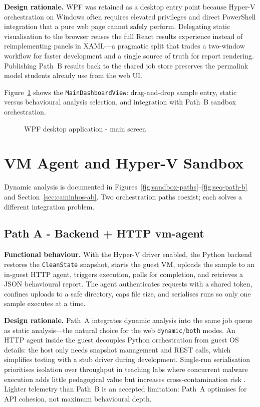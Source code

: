 \textbf{Design rationale.}
WPF was retained as a desktop entry point because Hyper-V orchestration on Windows often requires
elevated privileges and direct PowerShell integration that a pure web page cannot safely perform.
Delegating static visualisation to the browser reuses the full React results experience instead of
reimplementing panels in XAML---a pragmatic split that trades a two-window workflow for faster
development and a single source of truth for report rendering. Publishing Path~B results back to
the shared job store preserves the permalink model students already use from the web UI.

Figure~\ref{fig:wpf-dashboard} shows the \texttt{MainDashboardView}: drag-and-drop sample entry,
static versus behavioural analysis selection, and integration with Path~B sandbox orchestration.

\begin{figure}[H]
    \centering
    \caption{WPF desktop application - main screen}
    \label{fig:wpf-dashboard}
\end{figure}

\section{VM Agent and Hyper-V Sandbox}

Dynamic analysis is documented in Figures~\ref{fig:sandbox-paths}--\ref{fig:seq-path-b} and
Section~\ref{sec:caminhos-ab}. Two orchestration paths coexist; each solves a different integration
problem.

\subsection{Path A - Backend + HTTP vm-agent}

\textbf{Functional behaviour.}
With the Hyper-V driver enabled, the Python backend restores the \texttt{CleanState} snapshot,
starts the guest VM, uploads the sample to an in-guest HTTP agent, triggers execution, polls for
completion, and retrieves a JSON behavioural report. The agent authenticates requests with a
shared token, confines uploads to a safe directory, caps file size, and serialises runs so only one
sample executes at a time.

\textbf{Design rationale.}
Path~A integrates dynamic analysis into the same job queue as static analysis---the natural choice
for the web \texttt{dynamic}/\texttt{both} modes. An HTTP agent inside the guest decouples Python
orchestration from guest OS details: the host only needs snapshot management and REST calls, which
simplifies testing with a stub driver during development. Single-run serialisation prioritises
isolation over throughput in teaching labs where concurrent malware execution adds little pedagogical
value but increases cross-contamination risk \cite{alrawi2024}. Lighter telemetry than Path~B is an
accepted limitation: Path~A optimises for API cohesion, not maximum behavioural depth.

